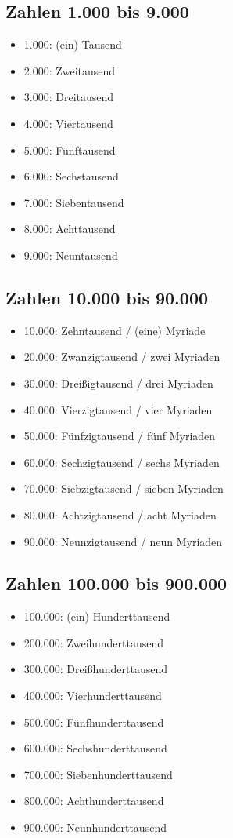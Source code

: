 \documentclass[a4paper]{article}
\begin{document}
\subsection{Zahlen 1.000 bis 9.000}
\begin{itemize}[nosep]
	\item 1.000: (ein) Tausend
	\item 2.000: Zweitausend
	\item 3.000: Dreitausend
	\item 4.000: Viertausend
	\item 5.000: F\"unftausend
	\item 6.000: Sechstausend
	\item 7.000: Siebentausend
	\item 8.000: Achttausend
	\item 9.000: Neuntausend
\end{itemize}

\subsection{Zahlen 10.000 bis 90.000}
\begin{itemize}[nosep]
	\item 10.000: Zehntausend / (eine) Myriade
	\item 20.000: Zwanzigtausend / zwei Myriaden
	\item 30.000: Drei{\ss}igtausend / drei Myriaden
	\item 40.000: Vierzigtausend / vier Myriaden
	\item 50.000: F\"unfzigtausend / f\"unf Myriaden
	\item 60.000: Sechzigtausend / sechs Myriaden
	\item 70.000: Siebzigtausend / sieben Myriaden
	\item 80.000: Achtzigtausend / acht Myriaden
	\item 90.000: Neunzigtausend / neun Myriaden
\end{itemize}

\subsection{Zahlen 100.000 bis 900.000}
\begin{itemize}[nosep]
	\item 100.000: (ein) Hunderttausend
	\item 200.000: Zweihunderttausend
	\item 300.000: Drei{\ss}hunderttausend
	\item 400.000: Vierhunderttausend
	\item 500.000: F\"unfhunderttausend
	\item 600.000: Sechshunderttausend
	\item 700.000: Siebenhunderttausend
	\item 800.000: Achthunderttausend
	\item 900.000: Neunhunderttausend
\end{itemize}
\end{document}
